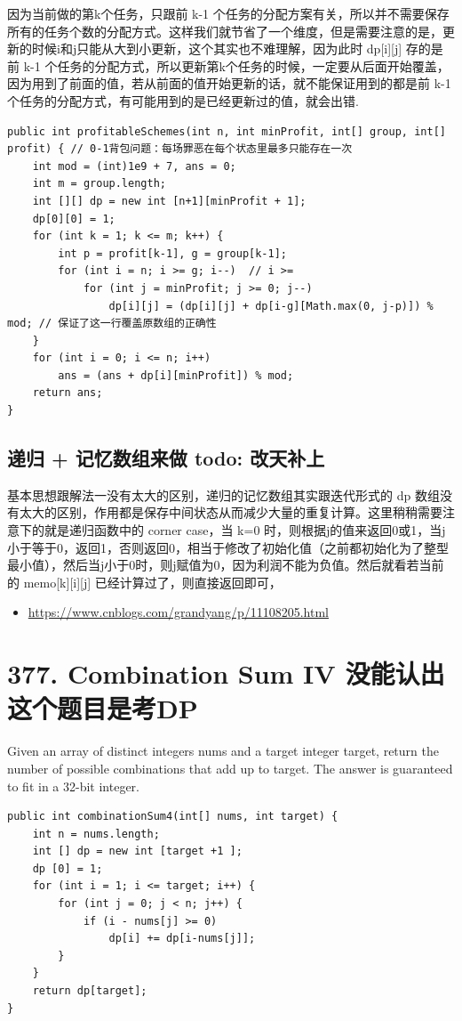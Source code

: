 \documentclass[9pt, b5paaper]{book}
\begin{document}
因为当前做的第k个任务，只跟前 k-1 个任务的分配方案有关，所以并不需要保存所有的任务个数的分配方式。这样我们就节省了一个维度，但是需要注意的是，更新的时候i和j只能从大到小更新，这个其实也不难理解，因为此时 dp[i][j] 存的是前 k-1 个任务的分配方式，所以更新第k个任务的时候，一定要从后面开始覆盖，因为用到了前面的值，若从前面的值开始更新的话，就不能保证用到的都是前 k-1 个任务的分配方式，有可能用到的是已经更新过的值，就会出错.
\begin{verbatim}
public int profitableSchemes(int n, int minProfit, int[] group, int[] profit) { // 0-1背包问题：每场罪恶在每个状态里最多只能存在一次
    int mod = (int)1e9 + 7, ans = 0;
    int m = group.length;
    int [][] dp = new int [n+1][minProfit + 1]; 
    dp[0][0] = 1;
    for (int k = 1; k <= m; k++) {
        int p = profit[k-1], g = group[k-1];
        for (int i = n; i >= g; i--)  // i >= 
            for (int j = minProfit; j >= 0; j--) 
                dp[i][j] = (dp[i][j] + dp[i-g][Math.max(0, j-p)]) % mod; // 保证了这一行覆盖原数组的正确性
    }
    for (int i = 0; i <= n; i++) 
        ans = (ans + dp[i][minProfit]) % mod;
    return ans;
}
\end{verbatim}
\subsection{递归 + 记忆数组来做 todo: 改天补上}
\label{sec-1-26-3}

基本思想跟解法一没有太大的区别，递归的记忆数组其实跟迭代形式的 dp 数组没有太大的区别，作用都是保存中间状态从而减少大量的重复计算。这里稍稍需要注意下的就是递归函数中的 corner case，当 k=0 时，则根据j的值来返回0或1，当j小于等于0，返回1，否则返回0，相当于修改了初始化值（之前都初始化为了整型最小值），然后当j小于0时，则j赋值为0，因为利润不能为负值。然后就看若当前的 memo[k][i][j] 已经计算过了，则直接返回即可，
\begin{itemize}
\item \url{https://www.cnblogs.com/grandyang/p/11108205.html}
\end{itemize}

\section{377. Combination Sum IV 没能认出这个题目是考DP}
\label{sec-1-27}
Given an array of distinct integers nums and a target integer target, return the number of possible combinations that add up to target.
The answer is guaranteed to fit in a 32-bit integer.
\begin{verbatim}
public int combinationSum4(int[] nums, int target) {
    int n = nums.length;
    int [] dp = new int [target +1 ];
    dp [0] = 1;
    for (int i = 1; i <= target; i++) {
        for (int j = 0; j < n; j++) {
            if (i - nums[j] >= 0)
                dp[i] += dp[i-nums[j]];
        }
    }
    return dp[target];
}
\end{verbatim}
\end{document}
